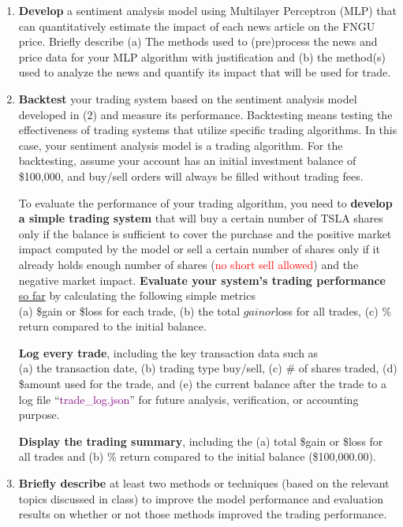 \documentclass[twocolumn,10pt]{article}
\begin{document}
\begin{multicols}{2}
\begin{flushleft}
\begin{enumerate}
	\item \textbf{Develop} a sentiment analysis model using Multilayer Perceptron (MLP) that can quantitatively estimate the impact of each news article on the FNGU price. Briefly describe 
		\subitem (a) The methods used to (pre)process the news and price data for your MLP algorithm with justification and 
		\subitem (b) the method(s) used to analyze the news and quantify its impact that will be used for trade.
	
	\item \textbf{Backtest} your trading system based on the sentiment analysis model developed in (2) and measure its performance. Backtesting means testing the effectiveness of trading systems that utilize specific trading algorithms. In this case, your sentiment analysis model is a trading algorithm. For the backtesting, assume your account has an initial investment balance of \$100,000, and buy/sell orders will always be filled without trading fees. 

	To evaluate the performance of your trading algorithm, you need to \textbf{develop a simple trading system} that will buy a certain number of TSLA shares only if the balance is sufficient to cover the purchase and the positive market impact computed by the model or sell a certain number of shares only if it already holds enough number of shares (\textcolor{red}{no short sell allowed}) and the negative market impact. 
	\textbf{Evaluate your system’s trading performance} \underline{so far} by calculating the following simple metrics\\
		\subitem (a) \$gain or \$loss for each trade, 
		\subitem (b) the total $gain or $loss for all trades, 
		\subitem (c) \% return compared to the initial balance. 
		
	\textbf{Log every trade}, including the key transaction data such as\\
		\subitem (a) the transaction date, 
		\subitem (b) trading type buy/sell, 
		\subitem (c) \# of shares traded, 
		\subitem (d) \$amount used for the trade, and 
		\subitem (e) the current balance after the trade to a log file \enquote{\textcolor{purple}{trade\_log.json}} for future analysis, verification, or accounting purpose.
		
	\textbf{Display the trading summary}, including the 
		\subitem (a) total \$gain or \$loss for all trades and
		\subitem (b) \% return compared to the initial balance (\$100,000.00).

	\item \textbf{Briefly describe} at least two methods or techniques (based on the relevant topics discussed in class) to improve the model performance and evaluation results on whether or not those methods improved the trading performance.
	

\end{enumerate}
\end{flushleft}
\end{multicols}
\end{document}
